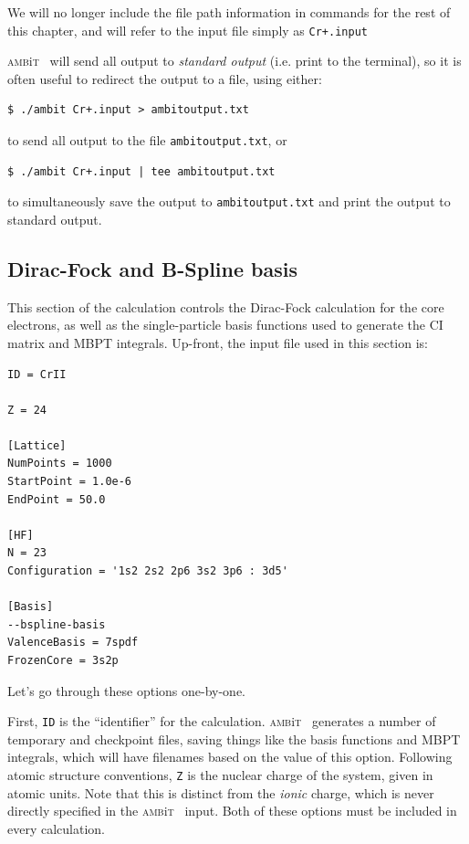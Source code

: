 \documentclass{report}
\newcommand{\ambit}{\textsc{amb}{\footnotesize i}\textsc{t}}
\begin{document}
We will no longer include the file path information in commands for the rest of this chapter, and will
refer to the input file simply as \texttt{Cr+.input}

\ambit~ will send all output to \textit{standard output} (i.e. print to the terminal), so it is often
useful to redirect the output to a file, using either:

\begin{verbatim}
$ ./ambit Cr+.input > ambitoutput.txt
\end{verbatim}

to send all output to the file \texttt{ambitoutput.txt}, or
\begin{verbatim}
$ ./ambit Cr+.input | tee ambitoutput.txt
\end{verbatim}

to simultaneously save the output to \texttt{ambitoutput.txt} and print the output to standard output.

\subsection{Dirac-Fock and B-Spline basis}
\label{sec:tut_DF}

This section of the calculation controls the Dirac-Fock calculation for the core electrons, as well as
the single-particle basis functions used to generate the CI matrix and MBPT integrals. Up-front, the 
input file used in this section is:

\begin{verbatim}
ID = CrII

Z = 24

[Lattice]
NumPoints = 1000
StartPoint = 1.0e-6
EndPoint = 50.0

[HF]
N = 23
Configuration = '1s2 2s2 2p6 3s2 3p6 : 3d5'

[Basis]
--bspline-basis
ValenceBasis = 7spdf
FrozenCore = 3s2p
\end{verbatim}

Let's go through these options one-by-one. 

First, \texttt{ID} is the ``identifier'' for the calculation. \ambit~ generates a number of temporary
and checkpoint files, saving things like the basis functions and MBPT integrals, which will have
filenames based on the value of this option. Following atomic structure conventions, \texttt{Z} is the
nuclear charge of the system, given in atomic units. Note that this is distinct from the \textit{ionic}
charge, which is never directly specified in the \ambit~ input. Both of these options must be included
in every calculation.
\end{document}
